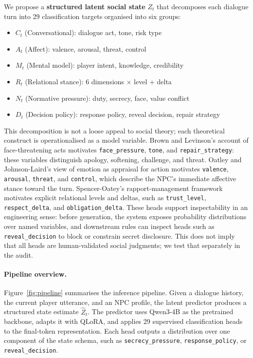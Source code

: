\documentclass[11pt]{article}
\begin{document}
We propose a \textbf{structured latent social state} $Z_t$ that decomposes each dialogue turn into 29 classification targets organised into six groups:
\begin{itemize}
    \item \textbf{$C_t$} (Conversational): dialogue act, tone, risk type
    \item \textbf{$A_t$} (Affect): valence, arousal, threat, control
    \item \textbf{$M_t$} (Mental model): player intent, knowledge, credibility
    \item \textbf{$R_t$} (Relational stance): 6 dimensions $\times$ level + delta
    \item \textbf{$N_t$} (Normative pressure): duty, secrecy, face, value conflict
    \item \textbf{$D_t$} (Decision policy): response policy, reveal decision, repair strategy
\end{itemize}

This decomposition is not a loose appeal to social theory; each theoretical construct is operationalised as a model variable.
Brown and Levinson's account of face-threatening acts motivates \texttt{face\_pressure}, \texttt{tone}, and \texttt{repair\_strategy}: these variables distinguish apology, softening, challenge, and threat.
Oatley and Johnson-Laird's view of emotion as appraisal for action motivates \texttt{valence}, \texttt{arousal}, \texttt{threat}, and \texttt{control}, which describe the NPC's immediate affective stance toward the turn.
Spencer-Oatey's rapport-management framework motivates explicit relational levels and deltas, such as \texttt{trust\_level}, \texttt{respect\_delta}, and \texttt{obligation\_delta}.
These heads support inspectability in an engineering sense: before generation, the system exposes probability distributions over named variables, and downstream rules can inspect heads such as \texttt{reveal\_decision} to block or constrain secret disclosure. This does not imply that all heads are human-validated social judgments; we test that separately in the audit.

\paragraph{Pipeline overview.}
Figure~\ref{fig:pipeline} summarises the inference pipeline. Given a dialogue history, the current player utterance, and an NPC profile, the latent predictor produces a structured state estimate $\hat{Z}_t$. The predictor uses Qwen3-4B as the pretrained backbone, adapts it with QLoRA, and applies 29 supervised classification heads to the final-token representation. Each head outputs a distribution over one component of the state schema, such as \texttt{secrecy\_pressure}, \texttt{response\_policy}, or \texttt{reveal\_decision}.
\end{document}

